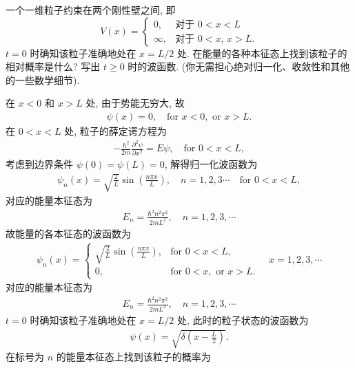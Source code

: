 \documentclass{assignment}
\begin{document}
\begin{prob}[课本习题 2.23]
    一个一维粒子约束在两个刚性壁之间, 即
    \[
        V(x)=\left\{\begin{array}{ll}
            0,&\text{对于 }0<x<L\\
            \infty,&\text{对于 }0<x,\,x>L.
        \end{array}\right.
    \]
    $t=0$ 时确知该粒子准确地处在 $x=L/2$ 处. 在能量的各种本征态上找到该粒子的相对概率是什么? 写出 $t\geq 0$ 时的波函数. (你无需担心绝对归一化、收敛性和其他的一些数学细节).
\end{prob}
\begin{sol}
    在 $x<0$ 和 $x>L$ 处, 由于势能无穷大, 故
    \begin{align}
        \psi(x)=0,\quad\text{for }x<0,\text{ or }x>L.
    \end{align}
    在 $0<x<L$ 处, 粒子的薛定谔方程为
    \begin{align}
        -\frac{\hbar^2}{2m}\frac{\partial^2\psi}{\partial x^2}=E\psi,\quad\text{for }0<x<L,
    \end{align}
    考虑到边界条件 $\psi(0)=\psi(L)=0$, 解得归一化波函数为
    \begin{align}
        \psi_n(x)=\sqrt{\frac{2}{L}}\sin\left(\frac{n\pi x}{L}\right),\quad n=1,2,3\cdots\quad\text{for }0<x<L,
    \end{align}
    对应的能量本征态为
    \begin{align}
        E_n=\frac{\hbar^2n^2\pi^2}{2mL^2},\quad n=1,2,3,\cdots
    \end{align}
    故能量的各本征态的波函数为
    \begin{align}
        \psi_n(x)=\left\{\begin{array}{ll}
            \sqrt{\frac{2}{L}}\sin\left(\frac{n\pi x}{L}\right),&\text{for }0<x<L,\\
            0,&\text{for }0<x,\text{ or }x>L.
        \end{array}\right.\quad x=1,2,3,\cdots
    \end{align}
    对应的能量本征态为
    \begin{align}
        E_n=\frac{\hbar^2n^2\pi^2}{2mL^2},\quad n=1,2,3,\cdots
    \end{align}
    $t=0$ 时确知该粒子准确地处在 $x=L/2$ 处, 此时的粒子状态的波函数为
    \begin{align}
        \psi(x)=\sqrt{\delta\left(x-\frac{L}{2}\right)}.
    \end{align}
    在标号为 $n$ 的能量本征态上找到该粒子的概率为
    \begin{align}

\end{align}
\end{sol}
\end{document}
